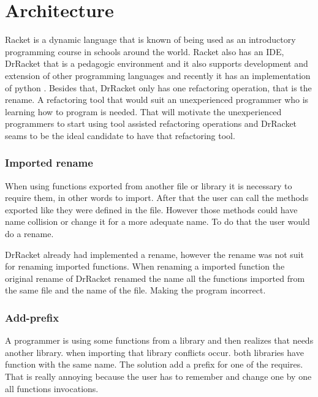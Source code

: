 
% 
% 

\section{Architecture}


Racket is a dynamic language that is known of being used as an introductory programming course in schools around the world. 
Racket also has an IDE, DrRacket that is a pedagogic environment \cite{drscheme_pegadogy} and it also supports development and extension of other programming languages \cite{tobin2011languages} and recently it has an implementation of python \cite{ramos2014implementation}.
Besides that, DrRacket only has one refactoring operation, that is the rename.
A refactoring tool that would suit an unexperienced programmer who is learning how to program is needed. 
That will motivate the unexperienced programmers to start using tool assisted refactoring operations and DrRacket seams to be the ideal candidate to have that refactoring tool.




\subsubsection{Imported rename}
When using functions exported from another file or library it is necessary to require them, in other words to import.
After that the user can call the methods exported like they were defined in the file.
However those methods could have name collision or change it for a more adequate name. To do that the user would do a rename.

DrRacket already had implemented a rename, however the rename was not suit for renaming imported functions.
When renaming a imported function the original rename of DrRacket renamed the name all the functions imported from the same file and the name of the file. 
Making the program incorrect.


\subsubsection{Add-prefix}
A programmer is using some functions from a library and then realizes that needs another library. when importing that library conflicts occur.
both libraries have function with the same name. The solution add a prefix for one of the requires.
That is really annoying because the user has to remember and change one by one all functions invocations.

